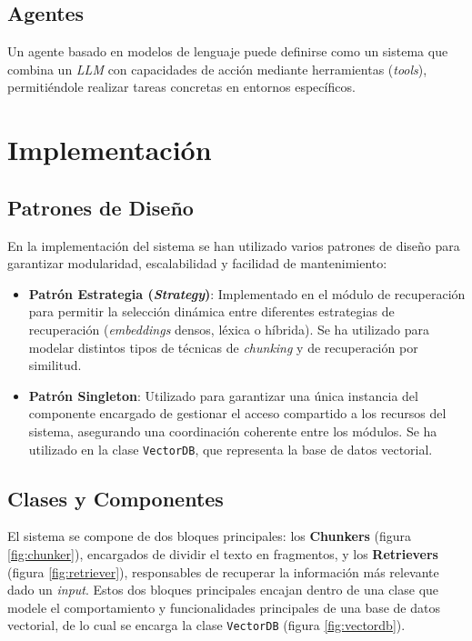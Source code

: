 \documentclass[12pt,letterpaper]{article}
\begin{document}
\subsection{Agentes}
Un agente basado en modelos de lenguaje puede definirse como un sistema que combina un \textit{LLM} con capacidades de acción mediante herramientas (\textit{tools}), permitiéndole realizar tareas concretas en entornos específicos.

\section{Implementación}

\subsection{Patrones de Diseño}

En la implementación del sistema se han utilizado varios patrones de diseño para garantizar modularidad, escalabilidad y facilidad de mantenimiento:

\begin{itemize}
    \item \textbf{Patrón Estrategia (\textit{Strategy})}: Implementado en el módulo de recuperación para permitir la selección dinámica entre diferentes estrategias de recuperación (\textit{embeddings} densos, léxica o híbrida). Se ha utilizado para modelar distintos tipos de técnicas de \textit{chunking} y de recuperación por similitud.

    \item \textbf{Patrón Singleton}: Utilizado para garantizar una única instancia del componente encargado de gestionar el acceso compartido a los recursos del sistema, asegurando una coordinación coherente entre los módulos. Se ha utilizado en la clase \texttt{VectorDB}, que representa la base de datos vectorial.

\end{itemize}

\subsection{Clases y Componentes}

El sistema se compone de dos bloques principales: los \textbf{Chunkers} (figura \ref{fig:chunker}), encargados de dividir el texto en fragmentos, y los \textbf{Retrievers} (figura \ref{fig:retriever}), responsables de recuperar la información más relevante dado un \textit{input}. Estos dos bloques principales encajan dentro de una clase que modele el comportamiento y funcionalidades principales de una base de datos vectorial, de lo cual se encarga la clase \texttt{VectorDB} (figura \ref{fig:vectordb}).
\end{document}
